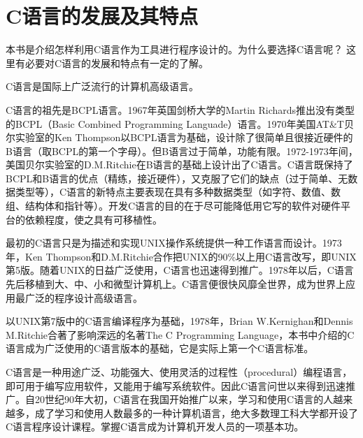 \section{C语言的发展及其特点}

本书是介绍怎样利用C语言作为工具进行程序设计的。为什么要选择C语言呢？ 这里有必要对C语言的发展和特点有一定的了解。

C语言是国际上广泛流行的计算机高级语言。

C语言的祖先是BCPL语言。1967年英国剑桥大学的Martin Richards推出没有类型的BCPL（Basic Combined Programming Languade）语言。1970年美国AT\&T贝尔实验室的Ken Thompson以BCPL语言为基础，设计除了很简单且很接近硬件的B语言（取BCPL的第一个字母）。但B语言过于简单，功能有限。1972-1973年间，美国贝尔实验室的D.M.Ritchie在B语言的基础上设计出了C语言。C语言既保持了BCPL和B语言的优点（精练，接近硬件），又克服了它们的缺点（过于简单、无数据类型等），C语言的新特点主要表现在具有多种数据类型（如字符、数值、数组、结构体和指针等）。开发C语言的目的在于尽可能降低用它写的软件对硬件平台的依赖程度，使之具有可移植性。

最初的C语言只是为描述和实现UNIX操作系统提供一种工作语言而设计。1973年，Ken Thompson和D.M.Ritchie合作把UNIX的90\%以上用C语言改写，即UNIX第5版。随着UNIX的日益广泛使用，C语言也迅速得到推广。1978年以后，C语言先后移植到大、中、小和微型计算机上。C语言便很快风靡全世界，成为世界上应用最广泛的程序设计高级语言。

以UNIX第7版中的C语言编译程序为基础，1978年，Brian W.Kernighan和Dennis M.Ritchie合著了影响深远的名著The C Programming Language，本书中介绍的C语言成为广泛使用的C语言版本的基础，它是实际上第一个C语言标准。

C语言是一种用途广泛、功能强大、使用灵活的过程性（procedural）编程语言，即可用于编写应用软件，又能用于编写系统软件。因此C语言问世以来得到迅速推广。自20世纪90年大初，C语言在我国开始推广以来，学习和使用C语言的人越来越多，成了学习和使用人数最多的一种计算机语言，绝大多数理工科大学都开设了C语言程序设计课程。掌握C语言成为计算机开发人员的一项基本功。

